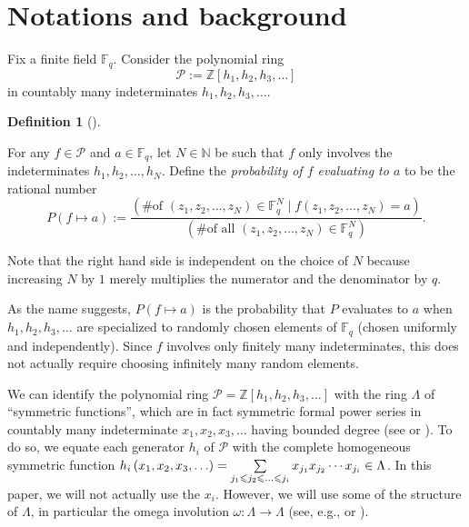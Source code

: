 \documentclass[numbers=enddot,12pt,final,onecolumn,notitlepage]{scrartcl}%
\theoremstyle{definition}
\newtheorem{defi}[theo]{Definition}
\newenvironment{definition}[1][]
{\begin{defi}[#1]\begin{leftbar}}
{\end{leftbar}\end{defi}}
\let\sumnonlimits\sum
\renewcommand{\sum}{\sumnonlimits\limits}
\newcommand{\tup}[1]{\left( #1 \right)}
\newcommand{\Fq}{\mathbb{F}_q}
\renewcommand{\leq}{\leqslant}
\theoremstyle{plainsl}
\begin{document}
\section{\label{sec.def}Notations and background}

Fix a finite field $\mathbb{F}_{q}$. Consider the polynomial ring 
\[
\mathcal{P} := \mathbb{Z}\left[  h_{1},h_{2},h_{3},\ldots\right]
\]
in countably many indeterminates $h_{1},h_{2},h_{3},\ldots$.

\begin{definition}
\label{def.mapstozero}
For any $f\in\mathcal{P}$ and $a\in\mathbb{F}_{q}$,
let $N\in\mathbb{N}$ be such that $f$ only
involves the indeterminates $h_{1},h_{2},\ldots,h_{N}$.
Define the \emph{probability of $f$ evaluating to $a$}
to be the rational number
\[
P\left(  f\mapsto a\right)  :=\dfrac{\left(  \text{\# of }\left(  z_{1}%
,z_{2},\ldots,z_{N}\right)  \in\mathbb{F}_{q}^{N} \mid f\left(
z_{1},z_{2},\ldots,z_{N}\right)  =a\right)  }{\left(  \text{\# of all }\left(
z_{1},z_{2},\ldots,z_{N}\right)  \in\mathbb{F}_{q}^{N}\right)  }.
\]
\end{definition}

Note that the right hand side is independent on the choice of $N$
because increasing $N$ by $1$
merely multiplies the numerator and the denominator by $q$.

As the name suggests, $P\tup{f \mapsto a}$ is the probability that
$P$ evaluates to $a$ when $h_1, h_2, h_3, \ldots$ are specialized
to randomly chosen elements of $\Fq$ (chosen uniformly and
independently). Since $f$ involves only finitely many indeterminates,
this does not actually require choosing infinitely many random
elements.

We can identify the polynomial ring
$\mathcal{P}=\mathbb{Z}\left[  h_{1},h_{2},h_{3},\ldots\right]  $
with the ring $\Lambda$ of ``symmetric
functions'', which are in fact symmetric formal power series in
countably many indeterminate $x_{1},x_{2},x_{3},\ldots$
having bounded degree (see \cite[Section 7.1]{EC2} or
\cite[Section I.2]{Macdonald}).
To do so, we equate each generator $h_i$ of $\mathcal{P}$
with the complete homogeneous symmetric function
$h_i\tup{x_1, x_2, x_3, \ldots}
= \sum\limits_{j_1 \leq j_2 \leq \ldots \leq j_i}
x_{j_1} x_{j_2} \cdots x_{j_i} \in \Lambda$.
In this paper, we will not actually use the $x_i$.
However, we will use some of the structure of $\Lambda$, in
particular the omega involution $\omega : \Lambda \to \Lambda$
(see, e.g., \cite[Section 7.6]{EC2} or \cite[(I.2.7)]{Macdonald}).
\end{document}
